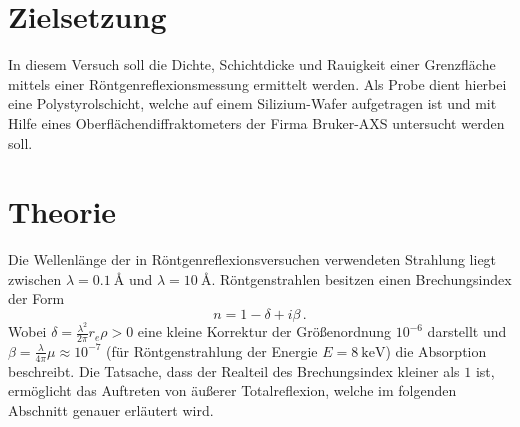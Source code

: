 \section{Zielsetzung}
In diesem Versuch soll die Dichte, Schichtdicke und Rauigkeit einer Grenzfläche mittels einer Röntgenreflexionsmessung ermittelt werden.
Als Probe dient hierbei eine Polystyrolschicht, welche auf einem Silizium-Wafer aufgetragen ist und mit Hilfe eines Oberflächendiffraktometers der Firma Bruker-AXS untersucht werden soll.

\section{Theorie}
Die Wellenlänge der in Röntgenreflexionsversuchen verwendeten Strahlung liegt zwischen $\lambda = \SI{0,1}{\angstrom}$ und $\lambda = \SI{10}{\angstrom}$.
Röntgenstrahlen besitzen einen Brechungsindex der Form
\begin{equation}
    n=1-\delta + i \beta \, .
    \label{eq:imag}
\end{equation}
Wobei $\delta = \frac{\lambda^2}{2\pi}r_e\rho > 0$ eine kleine Korrektur der Größenordnung $10^{-6}$ darstellt und $\beta = \frac{\lambda}{4\pi}\mu \approx 10^{-7}$ (für Röntgenstrahlung der Energie $E=\SI{8}{\keV}$) die Absorption beschreibt.
Die Tatsache, dass der Realteil des Brechungsindex kleiner als $1$ ist, ermöglicht das Auftreten von äußerer Totalreflexion, welche im folgenden Abschnitt genauer erläutert wird.

